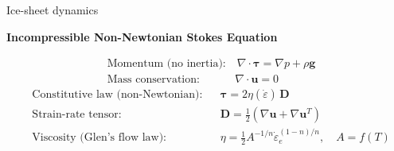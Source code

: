 \documentclass[aspectratio=169,xcolor=dvipsnames]{beamer}
\begin{document}
\begin{frame}[t]{Ice-sheet dynamics}

\vspace{-1.0em}

\begin{center}
\textbf{{\large
Incompressible Non-Newtonian Stokes Equation
}}
\end{center}

\small 
\center 

\vspace{-0.5em}

\begin{align*}
&\text{Momentum (no inertia):} \quad 
\nabla \cdot \boldsymbol{\tau} = \nabla p  + \rho \mathbf{g} \\
&\text{Mass conservation:} \quad\quad\quad\, 
 \nabla \cdot \mathbf{u} = 0
\end{align*}
\newline
\begin{align*}
&\text{Constitutive law (non-Newtonian):} && 
\boldsymbol{\tau} = 2 \eta(\dot{\varepsilon}) \, \mathbf{D} \\
&\text{Strain-rate tensor:} && 
\mathbf{D} = \frac{1}{2} \left( \nabla \mathbf{u} + \nabla \mathbf{u}^T \right) \\
&\text{Viscosity (Glen's flow law):} &&
\eta = \frac{1}{2} A^{-1/n} \dot{\varepsilon}_e^{(1-n)/n}, \quad A = f(T)
\end{align*}

\end{frame}
\end{document}
